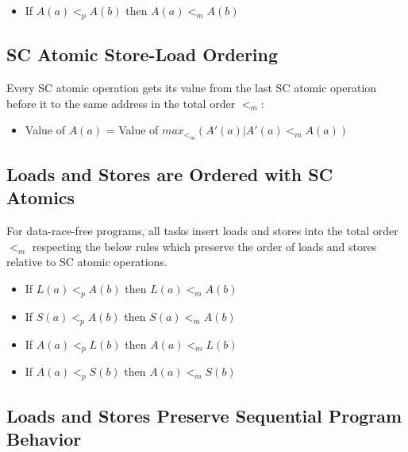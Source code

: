 \begin{itemize}
  \item If $A(a)<_pA(b)$ then $A(a)<_mA(b)$
\end{itemize}

\subsection{SC Atomic Store-Load Ordering}
\label{sc_atomic_store_load}

Every SC atomic operation gets its value from the last SC atomic operation before it to the same address in the total order $<_m$:
\begin{itemize}
  \item Value of $A(a)$ = Value of $max_{<_m} ( A'(a)|A'(a) <_m A(a) ) $
\end{itemize}

\subsection{Loads and Stores are Ordered with SC Atomics}
\label{loads_stores_ordererd_with_atomics}

For data-race-free programs, all tasks insert loads and stores into the
total order $<_m$ respecting the below rules which preserve the order of loads
and stores relative to SC atomic operations.



\begin{itemize}
  \item If $L(a)<_pA(b)$ then $L(a)<_mA(b)$
  \item If $S(a)<_pA(b)$ then $S(a)<_mA(b)$
  \item If $A(a)<_pL(b)$ then $A(a)<_mL(b)$
  \item If $A(a)<_pS(b)$ then $A(a)<_mS(b)$
\end{itemize}

\subsection{Loads and Stores Preserve Sequential Program Behavior}
\label{loads_stores_program_order}

